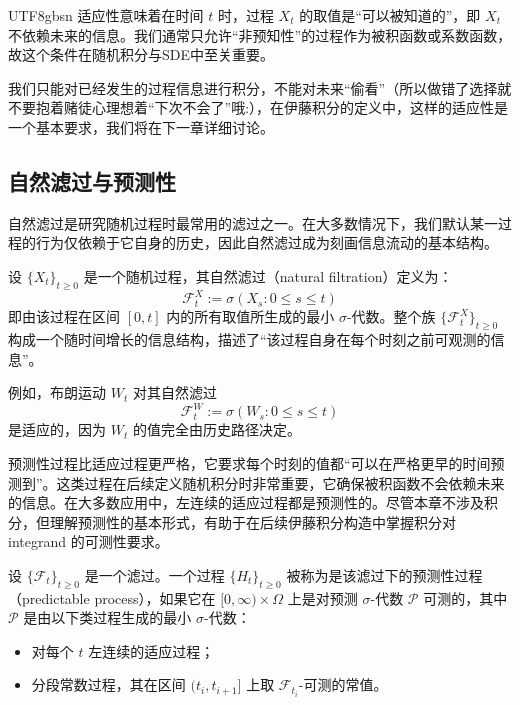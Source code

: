 \documentclass{article}
\begin{document}
\begin{CJK*}{UTF8}{gbsn}
适应性意味着在时间 $t$ 时，过程 $X_t$ 的取值是“可以被知道的”，即 $X_t$ 不依赖未来的信息。我们通常只允许“非预知性”的过程作为被积函数或系数函数，故这个条件在随机积分与SDE中至关重要。

我们只能对已经发生的过程信息进行积分，不能对未来“偷看”（所以做错了选择就不要抱着赌徒心理想着“下次不会了”哦:），在伊藤积分的定义中，这样的适应性是一个基本要求，我们将在下一章详细讨论。

\subsection{自然滤过与预测性}

自然滤过是研究随机过程时最常用的滤过之一。在大多数情况下，我们默认某一过程的行为仅依赖于它自身的历史，因此自然滤过成为刻画信息流动的基本结构。

\begin{definition}[自然滤过]
设 $\{X_t\}_{t \geq 0}$ 是一个随机过程，其自然滤过（natural filtration）定义为：
\[
\mathcal{F}^X_t := \sigma(X_s : 0 \leq s \leq t)
\]
即由该过程在区间 $[0, t]$ 内的所有取值所生成的最小 $\sigma$-代数。整个族 $\{\mathcal{F}^X_t\}_{t \geq 0}$ 构成一个随时间增长的信息结构，描述了“该过程自身在每个时刻之前可观测的信息”。
\end{definition}

例如，布朗运动 $W_t$ 对其自然滤过
\[
\mathcal{F}^W_t := \sigma(W_s : 0 \leq s \leq t)
\]
是适应的，因为 $W_t$ 的值完全由历史路径决定。

预测性过程比适应过程更严格，它要求每个时刻的值都“可以在严格更早的时间预测到”。这类过程在后续定义随机积分时非常重要，它确保被积函数不会依赖未来的信息。在大多数应用中，左连续的适应过程都是预测性的。尽管本章不涉及积分，但理解预测性的基本形式，有助于在后续伊藤积分构造中掌握积分对 integrand 的可测性要求。

\begin{definition}[预测性过程]
设 $\{\mathcal{F}_t\}_{t \geq 0}$ 是一个滤过。一个过程 $\{H_t\}_{t \geq 0}$ 被称为是该滤过下的预测性过程（predictable process），如果它在 $[0,\infty) \times \Omega$ 上是对预测 $\sigma$-代数 $\mathcal{P}$ 可测的，其中 $\mathcal{P}$ 是由以下类过程生成的最小 $\sigma$-代数：
\begin{itemize}
    \item 对每个 $t$ 左连续的适应过程；
    \item 分段常数过程，其在区间 $(t_i, t_{i+1}]$ 上取 $\mathcal{F}_{t_i}$-可测的常值。
\end{itemize}
\end{definition}


\end{CJK*}
\end{document}
